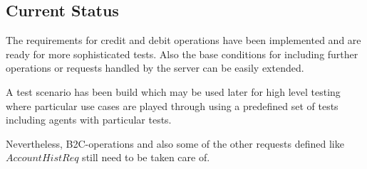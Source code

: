 \subsection{Current Status}

The requirements for credit and debit operations have been implemented and are ready for more sophisticated tests. Also the base conditions for including further operations or requests handled by the server can be easily extended.

A test scenario has been build which may be used later for high level testing where particular use cases are played through using a predefined set of tests including agents with particular tests.

Nevertheless, B2C-operations and also some of the other requests defined like $AccountHistReq$ still need to be taken care of.